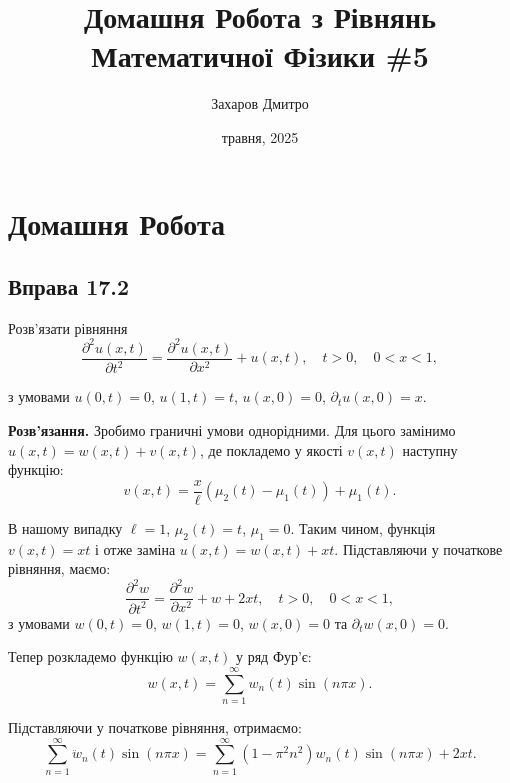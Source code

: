 \documentclass{hw_template}
\title{\huge\sffamily\bfseries Домашня Робота з Рівнянь Математичної Фізики \#5}
\author{\Large\sffamily Захаров Дмитро}
\date{\sffamily 7 травня, 2025}
\begin{document}
\pagestyle{fancy}

\maketitle

\tableofcontents

\pagebreak

\section{Домашня Робота}

\subsection{Вправа 17.2}

\begin{problem}
    Розв'язати рівняння
    \begin{equation*}
        \frac{\partial^2 u(x,t)}{\partial t^2} = \frac{\partial^2 u(x,t)}{\partial x^2} +  u(x,t), \quad t > 0, \quad 0 < x < 1,
    \end{equation*}

    з умовами $u(0,t)=0$, $u(1,t)=t$, $u(x,0)=0$, $\partial_t u(x,0)=x$.
\end{problem}

\textbf{Розв'язання.} Зробимо граничні умови однорідними. 
Для цього замінимо $u(x,t) = w(x,t) + v(x,t)$, де 
покладемо у якості $v(x,t)$ наступну функцію:
\begin{equation*}
    v(x,t) = \frac{x}{\ell}(\mu_2(t) - \mu_1(t)) + \mu_1(t).
\end{equation*}

В нашому випадку $\ell=1$, $\mu_2(t) = t$, $\mu_1=0$. Таким чином, функція
$v(x,t) = xt$ і отже заміна $u(x,t) = w(x,t) + xt$. Підставляючи у початкове 
рівняння, маємо:
\begin{equation*}
    \frac{\partial^2 w}{\partial t^2} = \frac{\partial^2 w}{\partial x^2} + w + 2xt, \quad t > 0, \quad 0 < x < 1,
\end{equation*}
з умовами $w(0,t)=0$, $w(1,t)=0$, $w(x,0)=0$ та $\partial_t w(x,0)=0$. 

Тепер розкладемо функцію $w(x,t)$ у ряд Фур'є:
\begin{equation*}
    w(x,t) = \sum_{n=1}^{\infty} w_n(t) \sin(n\pi x).
\end{equation*}

Підставляючи у початкове рівняння, отримаємо:
\begin{equation*}
    \sum_{n=1}^{\infty} \ddot{w}_n(t) \sin(n\pi x) = \sum_{n=1}^{\infty} (1-\pi^2n^2)w_n(t) \sin(n\pi x) + 2xt.
\end{equation*}
\end{document}

